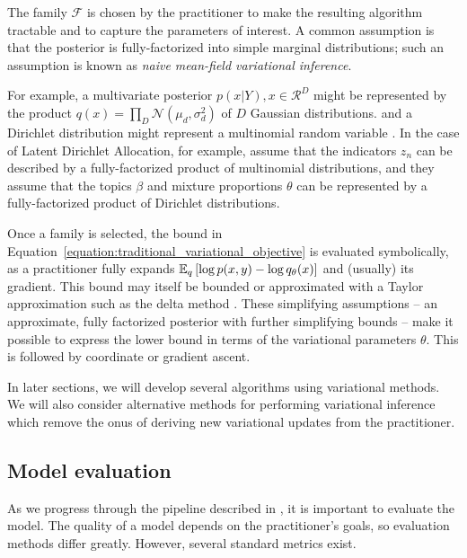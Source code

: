 The family $\mathcal{F}$ is chosen by the practitioner to make the
resulting algorithm tractable and to capture the parameters of
interest. A common assumption is that the posterior is
fully-factorized into simple marginal distributions; such an
assumption is known as \emph{naive mean-field variational inference}.

For example, a multivariate posterior $p(x | Y), x \in \mathcal{R}^D$
might be represented by the product $q(x) = \prod_D \mathcal{N}(\mu_d,
\sigma_d^2)$ of $D$ Gaussian distributions. and a Dirichlet
distribution might represent a multinomial random variable
\cite{bishop:2006}.  In the case of Latent Dirichlet Allocation, for
example, \citet{blei:2003} assume that the indicators $z_n$ can be
described by a fully-factorized product of multinomial distributions,
and they assume that the topics $\beta$ and mixture proportions
$\theta$ can be represented by a fully-factorized product of Dirichlet
distributions.

Once a family is selected, the bound in
Equation~\ref{equation:traditional_variational_objective} is evaluated
symbolically, as a practitioner fully expands $\mathbb{E}_q\left[ \log p(x, y)
  - \log q_\theta(x)\right]$ and (usually) its gradient. This bound may
itself be bounded or approximated with a Taylor approximation such as
the delta method \cite{bickel:2007,braun:2007}. These simplifying
assumptions -- an approximate, fully factorized posterior with further
simplifying bounds -- make it possible to express the lower bound in
terms of the variational parameters $\theta$.  This is followed by
coordinate or gradient ascent.

In later sections, we will develop several algorithms using
variational methods.  We will also consider alternative methods for
performing variational inference which remove the onus of deriving new
variational updates from the practitioner.


\subsection{Model evaluation}
As we progress through the pipeline described in , it
is important to evaluate the model.  The quality of a model depends on
the practitioner's goals, so evaluation methods differ greatly.
However, several standard metrics exist.

